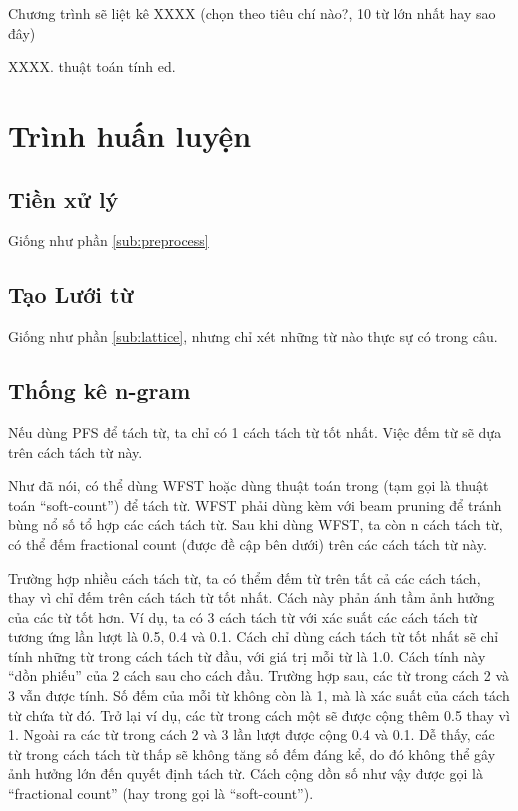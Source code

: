 \documentclass[a4paper]{book} %
\begin{document}
Chương trình sẽ liệt kê XXXX (chọn theo tiêu chí nào?, 10 từ lớn nhất
hay sao đây)

XXXX. thuật toán tính ed.


\section{Trình huấn luyện}

\subsection{Tiền xử lý}
Giống như phần \ref{sub:preprocess}


\subsection{Tạo Lưới từ}
Giống như phần \ref{sub:lattice}, nhưng chỉ xét những từ nào thực sự
có trong câu.


\subsection{Thống kê n-gram}
\label{sub:wordcount}

Nếu dùng PFS để tách từ, ta chỉ có 1 cách tách từ tốt nhất. Việc đếm
từ sẽ dựa trên cách tách từ này.

Như đã nói, có thể dùng WFST hoặc dùng thuật toán trong
\cite{softcount} (tạm gọi là thuật toán ``soft-count'') để tách
từ. WFST phải dùng kèm với beam pruning để tránh bùng nổ số tổ hợp các
cách tách từ. Sau khi dùng WFST, ta còn n cách tách từ, có thể đếm
fractional count (được đề cập bên dưới) trên các cách tách từ này.

Trường hợp nhiều cách tách từ, ta có thểm đếm từ trên tất cả các cách
tách, thay vì chỉ đếm trên cách tách từ tốt nhất. Cách này phản ánh
tầm ảnh hưởng của các từ tốt hơn. Ví dụ, ta có 3 cách tách từ với xác
suất các cách tách từ tương ứng lần lượt là 0.5, 0.4 và 0.1. Cách chỉ
dùng cách tách từ tốt nhất sẽ chỉ tính những từ trong cách tách từ
đầu, với giá trị mỗi từ là 1.0. Cách tính này ``dồn phiếu'' của 2 cách
sau cho cách đầu. Trường hợp sau, các từ trong cách 2 và 3 vẫn được
tính. Số đếm của mỗi từ không còn là 1, mà là xác suất của cách tách
từ chứa từ đó. Trở lại ví dụ, các từ trong cách một sẽ được cộng thêm
0.5 thay vì 1. Ngoài ra các từ trong cách 2 và 3 lần lượt được cộng
0.4 và 0.1. Dễ thấy, các từ trong cách tách từ thấp sẽ không tăng số
đếm đáng kể, do đó không thể gây ảnh hưởng lớn đến quyết định tách từ.
Cách cộng dồn số như vậy được gọi là ``fractional count'' (hay trong
\cite{softcount} gọi là ``soft-count'').
\end{document}

